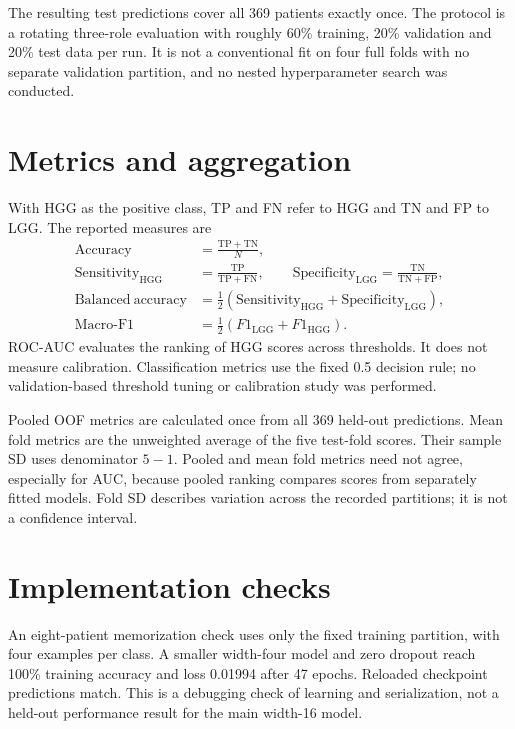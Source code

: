 \documentclass[12pt,a4paper,oneside]{report}
\begin{document}
The resulting test predictions cover all 369 patients exactly once. The protocol is a rotating three-role evaluation with roughly 60\% training, 20\% validation and 20\% test data per run. It is not a conventional fit on four full folds with no separate validation partition, and no nested hyperparameter search was conducted.

\section{Metrics and aggregation}
With HGG as the positive class, TP and FN refer to HGG and TN and FP to LGG. The reported measures are
\begin{align}
\mathrm{Accuracy}&=\frac{\mathrm{TP}+\mathrm{TN}}{N},\\
\mathrm{Sensitivity}_{\mathrm{HGG}}&=\frac{\mathrm{TP}}{\mathrm{TP}+\mathrm{FN}},\qquad
\mathrm{Specificity}_{\mathrm{LGG}}=\frac{\mathrm{TN}}{\mathrm{TN}+\mathrm{FP}},\\
\mathrm{Balanced\ accuracy}&=\tfrac12\left(\mathrm{Sensitivity}_{\mathrm{HGG}}+\mathrm{Specificity}_{\mathrm{LGG}}\right),\\
\mathrm{Macro\mbox{-}F1}&=\tfrac12\left(F1_{\mathrm{LGG}}+F1_{\mathrm{HGG}}\right).
\end{align}
ROC-AUC evaluates the ranking of HGG scores across thresholds. It does not measure calibration. Classification metrics use the fixed 0.5 decision rule; no validation-based threshold tuning or calibration study was performed.

Pooled OOF metrics are calculated once from all 369 held-out predictions. Mean fold metrics are the unweighted average of the five test-fold scores. Their sample SD uses denominator $5-1$. Pooled and mean fold metrics need not agree, especially for AUC, because pooled ranking compares scores from separately fitted models. Fold SD describes variation across the recorded partitions; it is not a confidence interval.

\section{Implementation checks}
An eight-patient memorization check uses only the fixed training partition, with four examples per class. A smaller width-four model and zero dropout reach 100\% training accuracy and loss 0.01994 after 47 epochs. Reloaded checkpoint predictions match. This is a debugging check of learning and serialization, not a held-out performance result for the main width-16 model.
\end{document}
